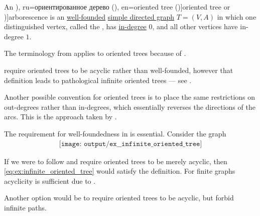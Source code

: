 \begin{definition}\label{def:oriented_tree}\mimprovised
  An \term[bg=ориентирано дърво (\cite[21]{Мирчев2001Графи}), ru=ориентированное дерево (\cite[def. 5.6]{БелоусовТкачёв2004ДискретнаяМатематика}), en=oriented tree (\cite[373]{Knuth1997ArtVol1})]{oriented tree} or \term[en=arborescence (\cite[\S 3.1]{GondranMinoux1984Graphs})]{arborescence} is an \hyperref[def:well_founded_graph]{well-founded} \hyperref[def:directed_graph]{simple directed graph} \( T = (V, A) \) in which one distinguished vertex, called the , has \hyperref[def:graph_cardinality/directed_degree]{in-degree} \( 0 \), and all other vertices have in-degree \( 1 \).
\end{definition}
\begin{comments}
  \item The terminology from  applies to oriented trees because of .

  \item {} require oriented trees to be acyclic rather than well-founded, however that definition leads to pathological infinite oriented trees --- see .

  \item Another possible convention for oriented trees is to place the same restrictions on out-degrees rather than in-degrees, which essentially reverses the directions of the arcs. This is the approach taken by .
\end{comments}

\begin{example}\label{ex:infinite_oriented_tree}
  The requirement for well-foundedness in  is essential. Consider the graph
  \begin{equation}\label{eq:ex:infinite_oriented_tree}
    \begin{aligned}
      \texttt{[image: output/ex\_\_infinite\_oriented\_tree]}
    \end{aligned}
  \end{equation}

  If we were to follow  and require oriented trees to be merely acyclic, then \eqref{eq:ex:infinite_oriented_tree} would satisfy the definition. For finite graphs acyclicity is sufficient due to .

  Another option would be to require oriented trees to be acyclic, but forbid infinite paths.
\end{example}


